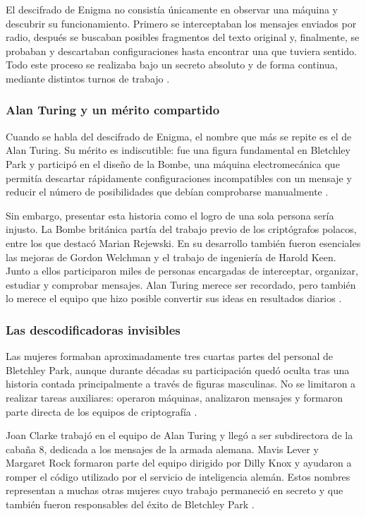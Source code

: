 El descifrado de Enigma no consistía únicamente en observar una máquina y descubrir su funcionamiento. Primero se interceptaban los mensajes enviados por radio, después se buscaban posibles fragmentos del texto original y, finalmente, se probaban y descartaban configuraciones hasta encontrar una que tuviera sentido. Todo este proceso se realizaba bajo un secreto absoluto y de forma continua, mediante distintos turnos de trabajo \cite{devel_turing_enigma}.

\subsubsection {Alan Turing y un mérito compartido}

Cuando se habla del descifrado de Enigma, el nombre que más se repite es el de Alan Turing. Su mérito es indiscutible: fue una figura fundamental en Bletchley Park y participó en el diseño de la Bombe, una máquina electromecánica que permitía descartar rápidamente configuraciones incompatibles con un mensaje y reducir el número de posibilidades que debían comprobarse manualmente \cite{devel_turing_enigma}.


Sin embargo, presentar esta historia como el logro de una sola persona sería injusto. La Bombe británica partía del trabajo previo de los criptógrafos polacos, entre los que destacó Marian Rejewski. En su desarrollo también fueron esenciales las mejoras de Gordon Welchman y el trabajo de ingeniería de Harold Keen. Junto a ellos participaron miles de personas encargadas de interceptar, organizar, estudiar y comprobar mensajes. Alan Turing merece ser recordado, pero también lo merece el equipo que hizo posible convertir sus ideas en resultados diarios \cite{devel_turing_enigma}.

\subsubsection {Las descodificadoras invisibles}

Las mujeres formaban aproximadamente tres cuartas partes del personal de Bletchley Park, aunque durante décadas su participación quedó oculta tras una historia contada principalmente a través de figuras masculinas. No se limitaron a realizar tareas auxiliares: operaron máquinas, analizaron mensajes y formaron parte directa de los equipos de criptografía \cite{telefonica_enigma}.


Joan Clarke trabajó en el equipo de Alan Turing y llegó a ser subdirectora de la cabaña 8, dedicada a los mensajes de la armada alemana. Mavis Lever y Margaret Rock formaron parte del equipo dirigido por Dilly Knox y ayudaron a romper el código utilizado por el servicio de inteligencia alemán. Estos nombres representan a muchas otras mujeres cuyo trabajo permaneció en secreto y que también fueron responsables del éxito de Bletchley Park \cite{telefonica_enigma}.


